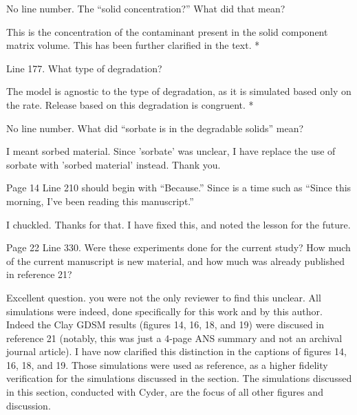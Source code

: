 \documentclass[answers,12pt]{exam}
\begin{document}
\begin{questions}
\question No line number. The ``solid concentration?'' What did that mean?
\begin{solution}
This is the concentration of the contaminant present in the solid component 
        matrix volume. This has been further clarified in the text.
        {\color{red}*}
\end{solution}
 

\question Line 177. What type of degradation?
\begin{solution}
The model is agnostic to the type of degradation, as it is simulated based only 
        on the rate.  Release based on this degradation is congruent.
        {\color{red}*}
\end{solution}

 

\question No line number. What did “sorbate is in the degradable solids” mean?
\begin{solution}
I meant sorbed material. Since 'sorbate' was unclear, I have replace the use of 
sorbate with 'sorbed material' instead. Thank you.
\end{solution}
 

\question Page 14 Line 210 should begin with “Because.” Since is a time such as “Since this morning, I’ve been reading this manuscript.”
\begin{solution}
I chuckled. Thanks for that. I have fixed this, and noted the lesson for the future. 
\end{solution}

 

\question Page 22 Line 330. Were these experiments done for the current study? How much of the current manuscript is new material, and how much was already published in reference 21?
\begin{solution}
Excellent question. you were not the only reviewer to find this unclear. All 
        simulations were indeed, done specifically for this work and by this 
        author. Indeed the Clay GDSM results (figures 14, 16, 18, and 19) 
        were discused in reference 21 (notably, this was just a 4-page ANS 
        summary and not an archival journal article).
        I have now clarified this distinction in the captions of 
        figures 14, 16, 18, and 19. Those simulations were used as reference, 
        as a higher fidelity verification for the simulations discussed in the 
        section. The simulations discussed in this section, conducted with 
        Cyder, are the focus of all other figures and discussion. 
\end{solution}


\end{questions}
\end{document}
